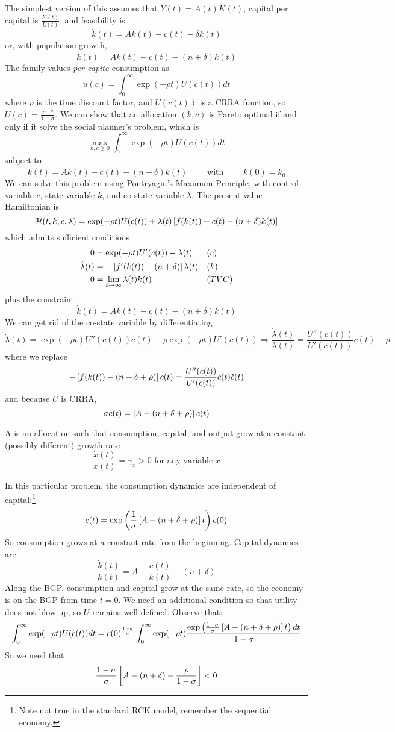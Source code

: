 \documentclass[10pt]{article}
\begin{document}
\begin{model}
	 The simplest version of this assumes that $Y(t) = A(t)K(t)$, capital per capital is $\frac{K(t)}{L(t)}$, and feasibility is \[\dot{k}(t) = Ak(t) - c(t) - \delta k(t)\]or, with population growth,\[\dot{k}(t) = Ak(t) - c(t) - (n+\delta)k(t)\]The family values \emph{per capita} consumption as\[u(c) = \int_0^\infty \exp(-\rho t)U(c(t))dt\]where $\rho$ is the time discount factor, and $U(c(t))$ is a CRRA function, so $U(c) = \frac{c^{1-\sigma}}{1-\sigma}$. We can show that an allocation $(k,c)$ is Pareto optimal if and only if it solve the social planner's problem, which is \[\max_{k,c \ge 0} \int_0^\infty \exp(-\rho t) U(c(t))dt \]subject to \[\dot{k}(t) = Ak(t) - c(t) - (n+\delta)k(t)\qquad \text{ with } \qquad k(0) =k_0\]We can solve this problem using Pontryagin's Maximum Principle, with control variable $c$, state variable $k$, and co-state variable $\lambda$. The present-value Hamiltonian is\[\mathcal{H}(t,k,c,\lambda) = \exp(-\rho t) U(c(t)) + \lambda(t) \left[ f(k(t)) - c(t) - (n+\delta)k(t)\right]\]which admits sufficient conditions \begin{align*} 0 &= \exp(-\rho t)U'(c(t)) -\lambda(t) &&(c) \\ \dot{\lambda}(t) &= -\left[ f'(k(t))- (n+\delta)\right] \lambda(t) &&(k) \\ 0 &= \lim_{t\to\infty} \lambda(t)k(t) &&(TVC)\end{align*}plus the constraint \[\dot{k}(t) = Ak(t) - c(t) - (n+\delta)k(t)\]We can get rid of the co-state variable by differentiating \[\dot{\lambda}(t) = \exp(-\rho t)U''(c(t))\dot{c}(t) - \rho \exp(-\rho t)U'(c(t)) \Longrightarrow \frac{\dot{\lambda}(t)}{\lambda(t)} = \frac{U''(c(t))}{U'(c(t))	} \dot{c}(t) - \rho\]where we replace \[-\left[ f(k(t))-(n+\delta + \rho)\right] c(t) = \frac{U''(c(t))}{U'(c(t))}c(t)\dot{c}(t)\]and because $U$ is CRRA,\[\sigma \dot{c}(t) = \left[ A - (n + \delta + \rho)\right] c(t)\]
\begin{definition}
	A  is an allocation such that consumption, capital, and output grow at a constant (possibly different) growth rate\[\frac{\dot{x}(t)}{x(t)} = \gamma_x > 0 \text{ for any variable } x\]
\end{definition}
	In this particular problem, the consumption dynamics are independent of capital:\footnote{Note not true in the standard RCK model, remember the sequential economy.}\[c(t) = \exp\left( \frac{1}{\sigma} \left[ A - (n + \delta + \rho)\right] t\right) c(0)\]So consumption grows at a constant rate from the beginning. Capital dynamics are \[\frac{\dot{k}(t)}{k(t)} = A - \frac{c(t)}{k(t)} - (n + \delta)\]Along the BGP, consumption and capital grow at the same rate, so the economy is on the BGP from time $t=0$. We need an additional condition so that utility does not blow up, so $U$ remains well-defined. Observe that:\[\int_0^\infty \exp(-\rho t) U(c(t))dt = c(0)^{\frac{1-\sigma}{\sigma}} \int_0^\infty \exp(-\rho t)\frac{\exp\left( \frac{1-\sigma}{\sigma}\left[ A - (n + \delta + \rho)\right] t\right) dt}{1-\sigma}\]So we need that \[\frac{1-\sigma}{\sigma} \left[ A - (n+\delta) - \frac{\rho}{1-\sigma}\right] < 0\]

\end{model}
\end{document}
